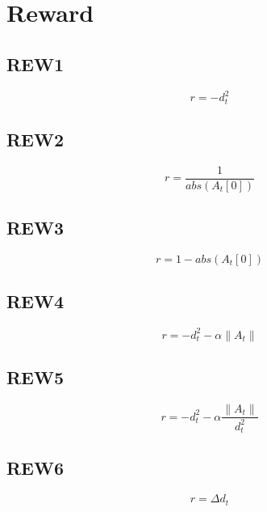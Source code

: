 \documentclass{article}
\newcommand{\norm}[1]{\left\lVert#1\right\rVert}
\begin{document}
\section{Reward}



\subsection*{REW1} 

\begin{equation}
r = - d_t^2
\end{equation}

\subsection*{REW2} 

\begin{equation}
r = \frac{1}{abs(A_t[0])}
\end{equation}

\subsection*{REW3} 

\begin{equation}
r = 1 - abs(A_t[0])
\end{equation}

\subsection*{REW4} 

\begin{equation}
r = - d_t^2 - \alpha \norm{A_t}
\end{equation}

\subsection*{REW5} 

\begin{equation}
r = - d_t^2 - \alpha \frac{\norm{A_t}}{d_t^2}
\end{equation}

\subsection*{REW6} 

\begin{equation}
r = \Delta d_t
\end{equation}
\end{document}
